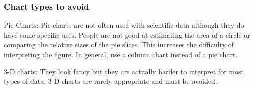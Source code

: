 \documentclass[12pt, hidelinks]{exam}
\newcommand*\AnswerBox[2]{%
    \parbox[t][#1]{0.92\textwidth}{%
    \begin{solution}#2\end{solution}
	\vskip\stretch{1}}
}
\begin{document}

\subsubsection*{Chart types to avoid}

Pie Charts: Pie charts are not often used with scientific data although they do have some specific uses. People are not good at estimating the area of a circle or comparing the relative sizes of the pie slices. This increases the difficulty of interpreting the figure. In general, use a column chart instead of a pie chart. 

3-D charts: They look fancy but they are actually harder to interpret for most types of data. 3-D charts are rarely appropriate and must be avoided. 
\end{document}
